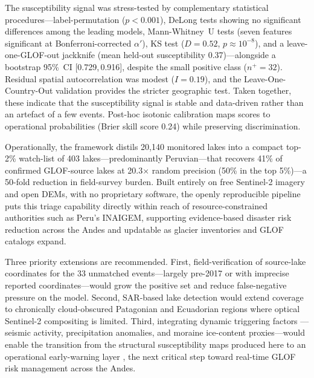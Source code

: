 \documentclass[pdflatex,sn-basic]{sn-jnl}%
\begin{document}
The susceptibility signal was stress-tested by complementary statistical
procedures---label-permutation ($p<0.001$), DeLong tests showing no
significant differences among the leading models, Mann-Whitney~U tests
(seven features significant at Bonferroni-corrected $\alpha'$),
KS test ($D\!=\!0.52$, $p\!\approx\!10^{-8}$), and a leave-one-GLOF-out
jackknife (mean held-out susceptibility 0.37)---alongside a
bootstrap 95\%~CI [0.729,\,0.916], despite the small positive
class ($n^+\!=\!32$). Residual spatial autocorrelation was modest
($I\!=\!0.19$), and the Leave-One-Country-Out validation provides the
stricter geographic test. Taken together, these indicate that the
susceptibility signal is stable and data-driven rather than an artefact of
a few events. Post-hoc isotonic calibration maps scores to operational
probabilities (Brier skill score 0.24) while preserving discrimination.

Operationally, the framework distils 20{,}140 monitored lakes into a
compact top-2\% watch-list of 403 lakes---predominantly Peruvian---that
recovers 41\% of confirmed GLOF-source lakes at 20.3$\times$ random
precision (50\% in the top 5\%)---a 50-fold reduction
in field-survey burden. Built entirely on free Sentinel-2 imagery and
open DEMs, with no proprietary software, the openly reproducible pipeline
puts this triage capability directly within reach of resource-constrained
authorities such as Peru's INAIGEM, supporting evidence-based disaster
risk reduction across the Andes and updatable as glacier inventories and
GLOF catalogs expand.

Three priority extensions are recommended.
First, field-verification of source-lake coordinates for the 33
unmatched events---largely pre-2017 or with imprecise reported
coordinates---would grow the positive set and
reduce false-negative pressure on the model. Second, SAR-based lake
detection \citep{Wangchuk2022} would extend coverage to chronically
cloud-obscured Patagonian and Ecuadorian regions where optical Sentinel-2
compositing is limited. Third, integrating dynamic triggering factors
---seismic activity, precipitation anomalies, and moraine ice-content
proxies---would enable the transition from the structural susceptibility
maps produced here to an operational early-warning layer
\citep{Rounce2023,Furian2022}, the next critical step toward real-time
GLOF risk management across the Andes.

\backmatter
\end{document}
